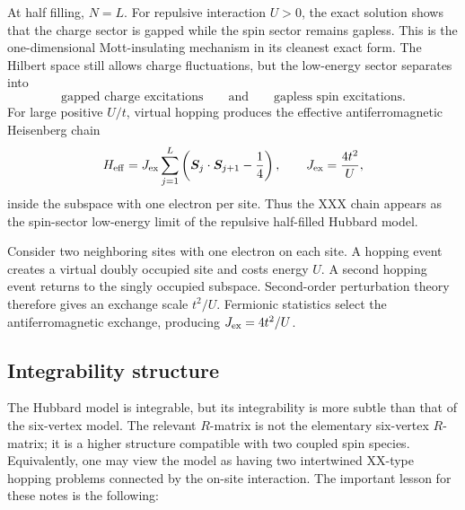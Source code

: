 At half filling, $N=L$.  For repulsive interaction $U>0$, the exact solution
shows that the charge sector is gapped while the spin sector remains gapless.
This is the one-dimensional Mott-insulating mechanism in its cleanest exact
form.  The Hilbert space still allows charge fluctuations, but the low-energy
sector separates into
\begin{equation}
\label{eq:further-hubbard-spin-charge-structure}
    \text{gapped charge excitations}
    \qquad\text{and}\qquad
    \text{gapless spin excitations}.
\end{equation}
For large positive $U/t$, virtual hopping produces the effective antiferromagnetic
Heisenberg chain
\begin{equation}
\label{eq:further-hubbard-large-U-heisenberg}
    H_{\rm eff}
    =
    J_{\rm ex}\sum_{j=1}^{L}
    \left(
        \bm{S}_j\cdot\bm{S}_{j+1}-\frac14
    \right),
    \qquad
    J_{\rm ex}=\frac{4t^2}{U},
\end{equation}
inside the subspace with one electron per site.  Thus the XXX chain appears as
the spin-sector low-energy limit of the repulsive half-filled Hubbard model.

\begin{example}
Consider two neighboring sites with one electron on each site.  A hopping event
creates a virtual doubly occupied site and costs energy $U$.  A second hopping
event returns to the singly occupied subspace.  Second-order perturbation theory
therefore gives an exchange scale $t^2/U$.  Fermionic statistics select the
antiferromagnetic exchange, producing $J_{\rm ex}=4t^2/U$.
\end{example}

\subsection{Integrability structure}
\label{subsec:further-hubbard-integrability}

The Hubbard model is integrable, but its integrability is more subtle than that
of the six-vertex model.  The relevant $R$-matrix is not the elementary
six-vertex $R$-matrix; it is a higher structure compatible with two coupled
spin species.  Equivalently, one may view the model as having two intertwined
XX-type hopping problems connected by the on-site interaction.  The important
lesson for these notes is the following:

